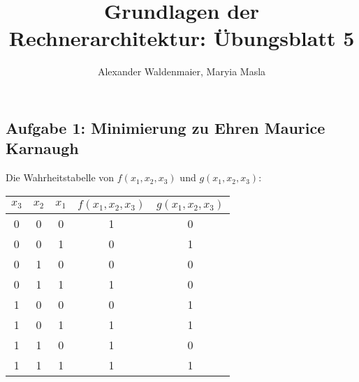 \documentclass{article}
\title{Grundlagen der Rechnerarchitektur: Übungsblatt 5}
\author{Alexander Waldenmaier, Maryia Masla}
\begin{document}
    \maketitle
	\subsection*{Aufgabe 1: Minimierung zu Ehren Maurice Karnaugh}
	Die Wahrheitstabelle von $f(x_1,x_2,x_3)$ und $g(x_1,x_2,x_3)$:
	\begin{table*}[h]
		\centering
		\begin{tabular}{c|c|c|c|c}
			$x_3$ & $x_2$ & $x_1$ & $f(x_1,x_2,x_3)$ & $g(x_1,x_2,x_3)$ \\ \hline
			0     & 0     & 0     & 1                & 0                \\
			0     & 0     & 1     & 0                & 1                \\
			0     & 1     & 0     & 0                & 0                \\
			0     & 1     & 1     & 1                & 0                \\
			1     & 0     & 0     & 0                & 1                \\
			1     & 0     & 1     & 1                & 1                \\
			1     & 1     & 0     & 1                & 0                \\
			1     & 1     & 1     & 1                & 1
		\end{tabular}
	\end{table*}
\end{document}
